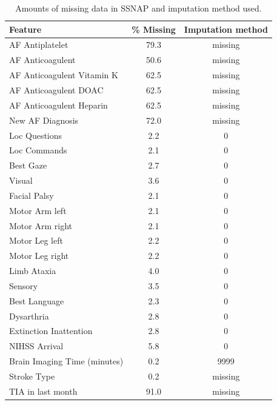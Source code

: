 \documentclass[12pt,a4paper, pdftex]{elsarticle}
\begin{document}



    \begin{table}[h!]
        \centering
        \begin{tabular}{|l|c|c|}
        \hline
        {\bf Feature} & {\bf \% Missing} & {\bf Imputation method}  \\
        \hline
        AF Antiplatelet & 79.3 & missing \\
        AF Anticoagulent & 50.6 & missing \\
        AF Anticoagulent Vitamin K & 62.5 & missing \\
        AF Anticoagulent DOAC & 62.5 &  missing \\
        AF Anticoagulent Heparin & 62.5 & missing \\
        New AF Diagnosis & 72.0 & missing \\
        Loc Questions & 2.2 &  0 \\
        Loc Commands & 2.1 & 0 \\
        Best Gaze & 2.7 & 0 \\
        Visual & 3.6 &  0 \\
        Facial Palsy & 2.1 & 0 \\
        Motor Arm left & 2.1 & 0 \\
        Motor Arm right & 2.1 & 0 \\
        Motor Leg left & 2.2 & 0 \\
        Motor Leg right & 2.2 & 0 \\
        Limb Ataxia & 4.0 & 0 \\
        Sensory & 3.5 & 0 \\
        Best Language & 2.3 & 0 \\
        Dysarthria & 2.8 & 0 \\
        Extinction Inattention & 2.8 & 0 \\
        NIHSS Arrival & 5.8 & 0 \\
        Brain Imaging Time (minutes) & 0.2 & 9999 \\
        Stroke Type & 0.2 & missing \\
        TIA in last month & 91.0 & missing \\
        
        \hline
        \end{tabular}
        \caption{Amounts of missing data in SSNAP and imputation method used.}
        \label{tab:S2}
    \end{table}
\end{document}
